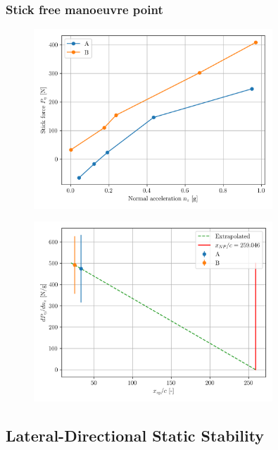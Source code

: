 \documentclass{article}
\begin{document}
\subsubsection{Stick free manoeuvre point}
\begin{figure}[H]
    \centering
    \includegraphics[width=0.8\textwidth]{Manoeuvre_Stability_3.png}
    \caption{}
    \label{fig:Manoeuvre_Stability_3}
\end{figure}
\begin{figure}[H]
    \centering
    \includegraphics[width=0.8\textwidth]{Manoeuvre_Stability_4.png}
    \caption{}
    \label{fig:Manoeuvre_Stability_4}
\end{figure}

\subsection{Lateral-Directional Static Stability}
\end{document}

